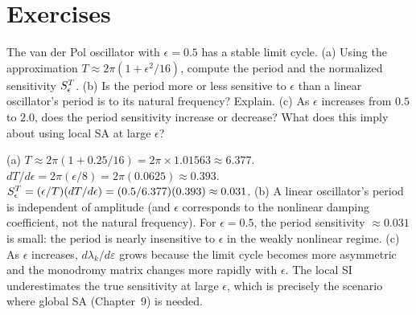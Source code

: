 \section{Exercises}
\label{appsec:D_exercises}

\begin{selfcheck}
The van der Pol oscillator with $\epsilon = 0.5$ has a stable limit cycle.
(a) Using the approximation $T \approx 2\pi(1 + \epsilon^2/16)$,
compute the period and the normalized sensitivity $S_{\epsilon}^{T}$.
(b) Is the period more or less sensitive to $\epsilon$ than a linear oscillator's
period is to its natural frequency? Explain.
(c) As $\epsilon$ increases from $0.5$ to $2.0$, does the period sensitivity
increase or decrease? What does this imply about using local SA at
large $\epsilon$?
\end{selfcheck}
\begin{scAnswer}
(a) $T \approx 2\pi(1 + 0.25/16) = 2\pi \times 1.01563 \approx 6.377$.
$dT/d\epsilon = 2\pi(\epsilon/8) = 2\pi(0.0625) \approx 0.393$.
$S_{\epsilon}^{T} = (\epsilon/T)(dT/d\epsilon) = (0.5/6.377)(0.393) \approx 0.031$.
(b) A linear oscillator's period is independent of amplitude (and $\epsilon$ corresponds
to the nonlinear damping coefficient, not the natural frequency). For $\epsilon=0.5$,
the period sensitivity $\approx 0.031$ is small: the period is nearly insensitive
to $\epsilon$ in the weakly nonlinear regime.
(c) As $\epsilon$ increases, $d\lambda_k/d\varepsilon$ grows because the limit cycle
becomes more asymmetric and the monodromy matrix changes more rapidly with $\epsilon$.
The local SI underestimates the true sensitivity at large $\epsilon$, which is precisely
the scenario where global SA (Chapter~9) is needed.
\end{scAnswer}

